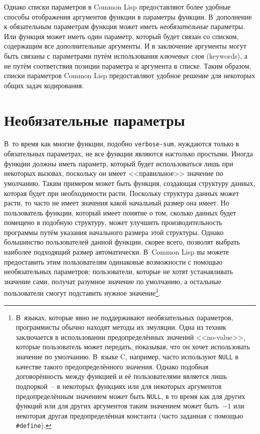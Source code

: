 Однако списки параметров в Common Lisp предоставляют более удобные способы отображения
аргументов функции в параметры функции.  В~дополнение к обязательным параметрам функция
может иметь \textit{необязательные} параметры.  Или функция может иметь один параметр,
который будет связан со списком, содержащим все дополнительные аргументы.  И в заключение
аргументы могут быть связаны с параметрами путём использования \textit{ключевых слов}
(keywords), а не путём соответствия позиции параметра и аргумента в списке.  Таким
образом, списки параметров Common Lisp предоставляют удобное решение для некоторых общих
задач кодирования.

\section{Необязательные параметры}

В~то время как многие функции, подобно \lstinline{verbose-sum}, нуждаются только в
обязательных параметрах, не все функции являются настолько простыми.  Иногда функции
должны иметь параметр, который будет использоваться лишь при некоторых вызовах, поскольку
он имеет <<правильное>> значение по умолчанию.  Таким примером может быть функция,
создающая структуру данных, которая будет при необходимости расти.  Поскольку структура
данных может расти, то часто не имеет значения какой начальный размер она имеет.  Но
пользователь функции, который имеет понятие о том, сколько данных будет помещено в
подобную структуру, может улучшить производительность программы путём указания начального
размера этой структуры.  Однако большинство пользователей данной функции, скорее всего,
позволят выбрать наиболее подходящий размер автоматически.  В~Common Lisp вы можете
предоставить этим пользователям одинаковые возможности с помощью необязательных
параметров; пользователи, которые не хотят устанавливать значение сами, получат разумное
значение по умолчанию, а остальные пользователи смогут подставить нужное
значение\footnote{В~языках, которые явно не поддерживают необязательных параметров,
  программисты обычно находят методы их эмуляции.  Одна из техник заключается в
  использовании предопределённых значений <<no-value>>, которые пользователь может
  передать, показывая, что он хочет использовать значение по умолчанию.  В~языке C,
  например, часто используют \lstinline{NULL} в качестве такого предопределённого
  значения.  Однако подобная договорённость между функцией и её пользователями является
  лишь подпоркой~-- в некоторых функциях или для некоторых аргументов предопределённым
  значением может быть \lstinline{NULL}, в то время как для других функций или для других
  аргументов таким значением может быть~$-1$ или некоторая другая предопределённая
  константа (часто заданная с помощью \lstinline!#define!).}\hspace{\footnotenegspace}.

